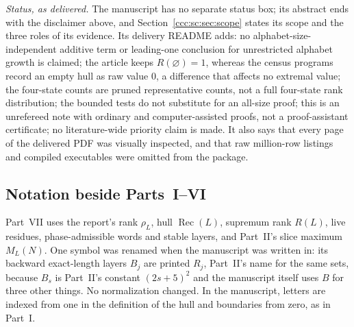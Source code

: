 \documentclass[11pt,letterpaper]{article}
\theoremstyle{definition}
\theoremstyle{remark}
\newcommand{\rec}{\operatorname{Rec}}
\newcommand{\rank}{\rho}
\begin{document}
\emph{Status, as delivered.} The manuscript has no separate status box; its
abstract ends with the disclaimer above, and
Section~\ref{ccc:sc:sec:scope} states its scope and the three roles of its
evidence. Its delivery README adds: no alphabet-size-independent additive
term or leading-one conclusion for unrestricted alphabet growth is claimed;
the article keeps $R(\varnothing)=1$, whereas the census programs record an
empty hull as raw value $0$, a difference that affects no extremal value;
the four-state counts are pruned representative counts, not a full
four-state rank distribution; the bounded tests do not substitute for an
all-size proof; this is an unrefereed note with ordinary and
computer-assisted proofs, not a proof-assistant certificate; no
literature-wide priority claim is made. It also says that every page of the
delivered PDF was visually inspected, and that raw million-row listings and
compiled executables were omitted from the package.

\subsection{Notation beside Parts~I--VI}\label{ccc:sc:sec:notation}

Part~VII uses the report's rank $\rank_L$, hull $\rec(L)$, supremum rank
$R(L)$, live residues, phase-admissible words and stable layers, and Part~II's
slice maximum $M_L(N)$. One symbol was renamed when the manuscript was written in: its
backward exact-length layers $B_j$ are printed $R_j$, Part~II's name for the
same sets, because $B_s$ is Part~II's constant $(2s+5)^2$ and the manuscript
itself uses $B$ for three other things. No normalization changed. In the
manuscript, letters are indexed from one in the definition of the hull and
boundaries from zero, as in Part~I.
\end{document}
